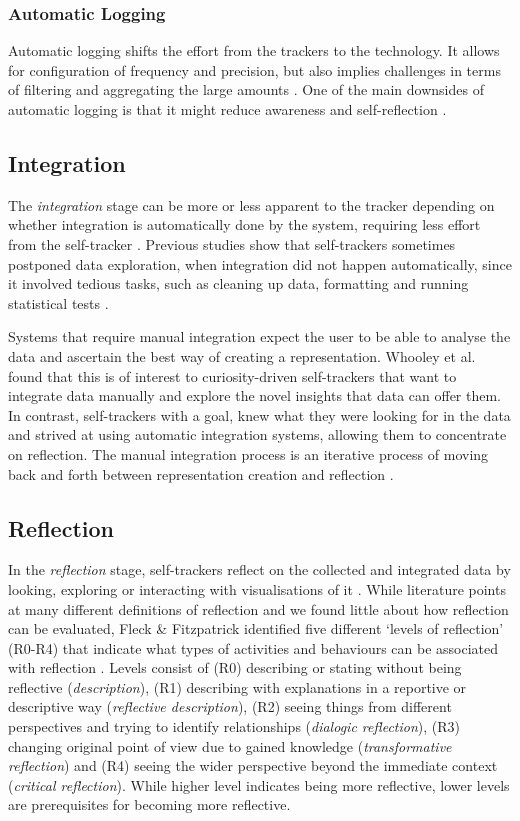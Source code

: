 \subsubsection{Automatic Logging}
Automatic logging shifts the effort from the trackers to the technology. It allows for configuration of frequency and precision, but also implies challenges in terms of filtering and aggregating the large amounts \cite{Muller}. One of the main downsides of automatic logging is that it might reduce awareness and self-reflection \cite{Choe2014, Li2011}.

\subsection{Integration}
The \textit{integration} stage can be more or less apparent to the tracker depending on whether integration is automatically done by the system, requiring less effort from the self-tracker \cite{Li2010}. Previous studies show that self-trackers sometimes postponed data exploration, when integration did not happen automatically, since it involved tedious tasks, such as cleaning up data, formatting and running statistical tests \cite{Choe2014, Chung2015, Li2010}. 

Systems that require manual integration expect the user to be able to analyse the data and ascertain the best way of creating a representation. Whooley et al. found that this is of interest to curiosity-driven self-trackers that want to integrate data manually and explore the novel insights that data can offer them. In contrast, self-trackers with a goal, knew what they were looking for in the data and strived at using automatic integration systems, allowing them to concentrate on reflection. The manual integration process is an iterative process of moving back and forth between representation creation and reflection \cite{Whooley2014}. 

\subsection{Reflection}
In the \textit{reflection} stage, self-trackers reflect on the collected and integrated data by looking, exploring or interacting with visualisations of it \cite{Li2010}. While literature points at many different definitions of reflection and we found little about how reflection can be evaluated, Fleck \& Fitzpatrick identified five different ‘levels of reflection’ (R0-R4) that indicate what types of activities and behaviours can be associated with reflection \cite{Fleck}. Levels consist of (R0) describing or stating without being reflective (\textit{description}), (R1) describing with explanations in a reportive or descriptive way (\textit{reflective description}), (R2) seeing things from different perspectives and trying to identify relationships (\textit{dialogic reflection}), (R3) changing original point of view due to gained knowledge (\textit{transformative reflection}) and (R4) seeing the wider perspective beyond the immediate context (\textit{critical reflection}). While higher level indicates being more reflective, lower levels are prerequisites for becoming more reflective. 

